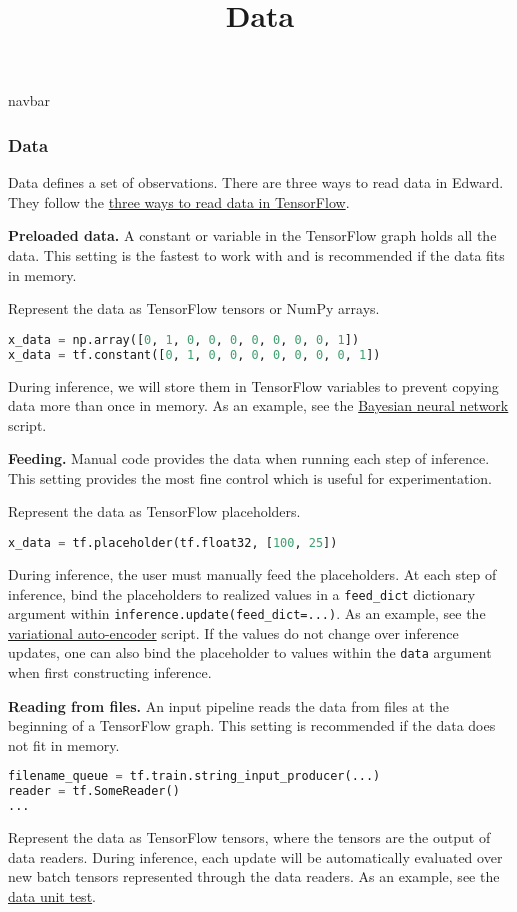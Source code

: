 \title{Data}

{{navbar}}

\subsubsection{Data}

Data defines a set of observations. There are three ways
to read data in Edward. They follow the
\href{https://www.tensorflow.org/versions/master/how_tos/reading_data/index.html}
{three ways to read data in TensorFlow}.

\textbf{Preloaded data.}
A constant or variable in the TensorFlow graph holds all the data.
This setting is the fastest to work with and is recommended if the
data fits in memory.

Represent the data as TensorFlow tensors or NumPy arrays.

\begin{lstlisting}[language=Python]
x_data = np.array([0, 1, 0, 0, 0, 0, 0, 0, 0, 1])
x_data = tf.constant([0, 1, 0, 0, 0, 0, 0, 0, 0, 1])
\end{lstlisting}

During inference, we will store them in TensorFlow variables to
prevent copying data more than once in memory. As an example, see the
\href{https://github.com/blei-lab/edward/blob/master/examples/bayesian_nn.py}
{Bayesian neural network} script.

\textbf{Feeding.}
Manual code provides the data when running each step of inference.
This setting provides the most fine control which is useful for
experimentation.

Represent the data as TensorFlow placeholders.

\begin{lstlisting}[language=Python]
x_data = tf.placeholder(tf.float32, [100, 25])
\end{lstlisting}

During inference, the user must manually feed the placeholders. At each
step of inference, bind the placeholders to realized values in a
\texttt{feed_dict} dictionary argument within
\texttt{inference.update(feed_dict={...})}. As an example, see the
\href{https://github.com/blei-lab/edward/blob/master/examples/vae.py}
{variational auto-encoder} script.
If the values do not change over inference updates, one can also bind
the placeholder to values within the \texttt{data} argument when
first constructing inference.

\textbf{Reading from files.}
An input pipeline reads the data from files at the beginning of a
TensorFlow graph. This setting is recommended if the data does not
fit in memory.

\begin{lstlisting}[language=Python]
filename_queue = tf.train.string_input_producer(...)
reader = tf.SomeReader()
...
\end{lstlisting}

Represent the data as TensorFlow tensors, where the tensors are the
output of data readers. During inference, each update will be
automatically evaluated over new batch tensors represented through
the data readers. As an example, see the
\href{https://github.com/blei-lab/edward/blob/master/tests/test-inferences/test_data.py}
{data unit test}.
